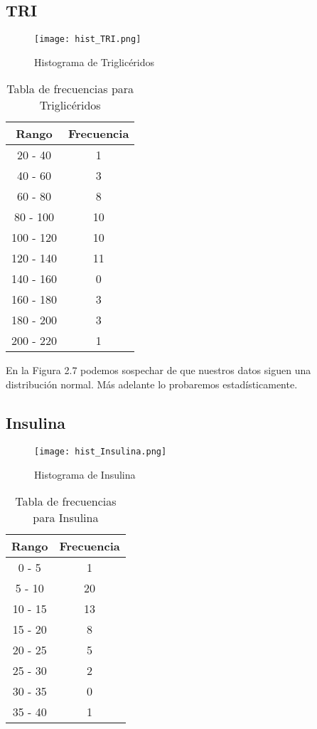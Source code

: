 \documentclass[12pt]{report}
\begin{document}
\subsection{TRI}
\begin{figure}[H]
    \centering
    \texttt{[image: hist\_TRI.png]}
    \caption{Histograma de Triglicéridos}
\end{figure}

\begin{table}[H]
    \centering
    \begin{tabular}{|c|c|}
        \hline
        \textbf{Rango} & \textbf{Frecuencia} \\
        \hline
        20 - 40 & 1 \\
        40 - 60 & 3 \\
        60 - 80 & 8 \\
        80 - 100 & 10 \\
        100 - 120 & 10 \\
        120 - 140 & 11 \\
        140 - 160 & 0 \\
        160 - 180 & 3 \\
        180 - 200 & 3 \\
        200 - 220 & 1 \\
        \hline
    \end{tabular}
    \caption{Tabla de frecuencias para Triglicéridos}
\end{table}
\noindent En la Figura 2.7 podemos sospechar de que nuestros datos siguen una distribución normal. Más adelante lo probaremos estadísticamente.

\subsection{Insulina}
\begin{figure}[H]
    \centering
    \texttt{[image: hist\_Insulina.png]}
    \caption{Histograma de Insulina}
\end{figure}

\begin{table}[H]
    \centering
    \begin{tabular}{|c|c|}
        \hline
        \textbf{Rango} & \textbf{Frecuencia} \\
        \hline
        0 - 5 & 1 \\
        5 - 10 & 20 \\
        10 - 15 & 13 \\
        15 - 20 & 8 \\
        20 - 25 & 5 \\
        25 - 30 & 2 \\
        30 - 35 & 0 \\
        35 - 40 & 1 \\
        \hline
    \end{tabular}
    \caption{Tabla de frecuencias para Insulina}
\end{table}
\end{document}
